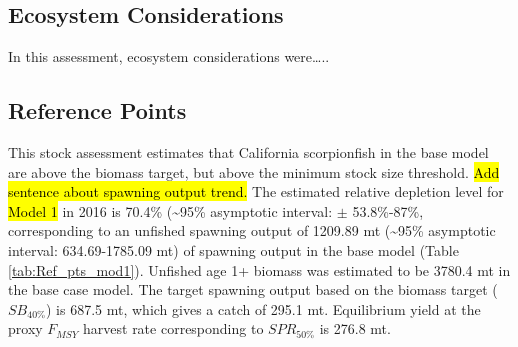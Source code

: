 \documentclass[12pt,]{article}
\begin{document}
\FloatBarrier

\subsection*{Ecosystem Considerations}\label{ecosystem-considerations}

In this assessment, ecosystem considerations were\ldots{}..

\subsection*{Reference Points}\label{reference-points}

This stock assessment estimates that California scorpionfish in the base
model are above the biomass target, but above the minimum stock size
threshold. \hl{Add sentence about spawning output trend.} The estimated
relative depletion level for \hl{Model 1} in 2016 is 70.4\%
(\textasciitilde{}95\% asymptotic interval: \(\pm\) 53.8\%-87\%,
corresponding to an unfished spawning output of 1209.89 mt
(\textasciitilde{}95\% asymptotic interval: 634.69-1785.09 mt) of
spawning output in the base model (Table \ref{tab:Ref_pts_mod1}).
Unfished age 1+ biomass was estimated to be 3780.4 mt in the base case
model. The target spawning output based on the biomass target
(\(SB_{40\%}\)) is 687.5 mt, which gives a catch of 295.1 mt.
Equilibrium yield at the proxy \(F_{MSY}\) harvest rate corresponding to
\(SPR_{50\%}\) is 276.8 mt.

\FloatBarrier
\end{document}
